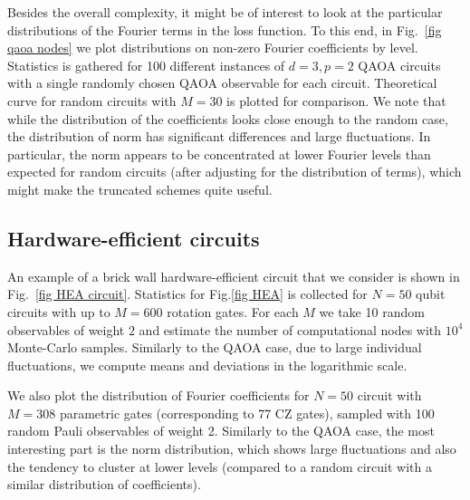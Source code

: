 \documentclass[twocolumn, amsfonts, amssymb, aps, nofootinbib]{revtex4-2}
\newcommand{\CZ}{\textsf{CZ }}
\begin{document}
Besides the overall complexity, it might be of interest to look at the particular distributions of the Fourier terms in the loss function. To this end, in Fig.~\ref{fig qaoa nodes}  we plot distributions on non-zero Fourier coefficients by level. Statistics is gathered for 100 different instances of $d=3,p=2$ QAOA circuits with a single randomly chosen QAOA observable for each circuit. Theoretical curve for random circuits with $M=30$ is plotted for comparison. We note that while the distribution of the coefficients looks close enough to the random case, the distribution of norm has significant differences and large fluctuations. In particular, the norm appears to be concentrated at lower Fourier levels than expected for random circuits (after adjusting for the distribution of terms), which might make the truncated schemes quite useful.
 
\subsection{Hardware-efficient circuits} \label{app HEA}
An example of a brick wall hardware-efficient circuit that we consider is shown in Fig.~\ref{fig HEA circuit}. Statistics for Fig.\ref{fig HEA} is collected for $N=50$ qubit circuits with up to $M=600$ rotation gates. For each $M$ we take 10 random observables of weight $2$ and estimate the number of computational nodes with $10^4$ Monte-Carlo samples. Similarly to the QAOA case, due to large individual fluctuations, we compute means and deviations in the logarithmic scale.

We also plot the distribution of Fourier coefficients for $N=50$ circuit with $M=308$ parametric gates (corresponding to 77 \CZ gates), sampled with 100 random Pauli observables of weight 2. Similarly to the QAOA case, the most interesting part is the norm distribution, which shows large fluctuations and also the tendency to cluster at lower levels (compared to a random circuit with a similar distribution of coefficients).
\end{document}
